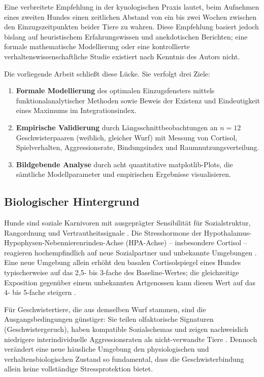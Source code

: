 ﻿\documentclass[12pt, a4paper]{article}
\theoremstyle{plain}
\theoremstyle{definition}
\theoremstyle{remark}
\begin{document}
Eine verbreitete Empfehlung in der kynologischen Praxis lautet, beim Aufnehmen
eines zweiten Hundes einen zeitlichen Abstand von ein bis zwei Wochen zwischen
den Einzugszeitpunkten beider Tiere zu wahren. Diese Empfehlung basiert jedoch
bislang auf heuristischem Erfahrungswissen und anekdotischen Berichten; eine
formale mathematische Modellierung oder eine kontrollierte verhaltenswissenschaftliche
Studie existiert nach Kenntnis des Autors nicht.

Die vorliegende Arbeit schließt diese Lücke. Sie verfolgt drei Ziele:

\begin{enumerate}[leftmargin=*, label=(\roman*)]
  \item \textbf{Formale Modellierung} des optimalen Einzugsfensters mittels
    funktionalanalytischer Methoden sowie Beweis der Existenz und Eindeutigkeit
    eines Maximums im Integrationsindex.
  \item \textbf{Empirische Validierung} durch Längsschnittbeobachtungen an
    $n = 12$ Geschwisterpaaren (weiblich, gleicher Wurf) mit Messung von
    Cortisol, Spielverhalten, Aggressionsrate, Bindungsindex und
    Raumnutzungsverteilung.
  \item \textbf{Bildgebende Analyse} durch acht quantitative matplotlib-Plots,
    die sämtliche Modellparameter und empirischen Ergebnisse visualisieren.
\end{enumerate}

\subsection{Biologischer Hintergrund}

Hunde sind soziale Karnivoren mit ausgeprägter Sensibilität für Sozialstruktur,
Rangordnung und Vertrautheitssignale \cite{miklosi2007dog}. Die
Stresshormone der Hypothalamus-Hypophysen-Nebennierenrinden-Achse
(HPA-Achse) -- insbesondere Cortisol -- reagieren hochempfindlich auf neue
Sozialpartner und unbekannte Umgebungen \cite{beerda1998behavioural}. Eine neue
Umgebung allein erhöht den basalen Cortisolspiegel eines Hundes typischerweise
auf das 2{,}5- bis 3-fache des Baseline-Wertes; die gleichzeitige Exposition
gegenüber einem unbekannten Artgenossen kann diesen Wert auf das 4- bis
5-fache steigern \cite{hennessy1997plasma}.

Für Geschwistertiere, die aus demselben Wurf stammen, sind die
Ausgangsbedingungen günstiger: Sie teilen olfaktorische Signaturen
(Geschwistergeruch), haben kompatible Sozialschemas und zeigen nachweislich
niedrigere interindividuelle Aggressionsraten als nicht-verwandte Tiere
\cite{pal2005pup}. Dennoch verändert eine neue häusliche Umgebung den
physiologischen und verhaltensbiologischen Zustand so fundamental, dass die
Geschwisterbindung allein keine vollständige Stressprotektion bietet.
\end{document}
